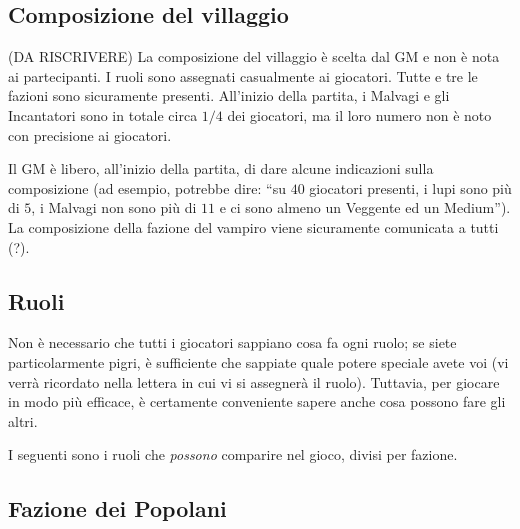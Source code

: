 \documentclass[a4paper,10pt]{article}
\begin{document}
\subsection{Composizione del villaggio}

(DA RISCRIVERE)
La composizione del villaggio è scelta dal GM e non è nota ai partecipanti. I ruoli sono assegnati casualmente ai giocatori.
Tutte e tre le fazioni sono sicuramente presenti. All'inizio della partita, i Malvagi e gli Incantatori sono in totale circa $1/4$ dei giocatori, ma il loro numero non è noto con precisione ai giocatori.

Il GM è libero, all'inizio della partita, di dare alcune indicazioni sulla composizione (ad esempio, potrebbe dire: ``su $40$ giocatori presenti, i lupi sono più di $5$, i Malvagi non sono più di $11$ e ci sono almeno un Veggente ed un Medium''). La composizione della fazione del vampiro viene sicuramente comunicata a tutti (?).


\subsection{Ruoli}

Non è necessario che tutti i giocatori sappiano cosa fa ogni ruolo; se siete particolarmente pigri, è sufficiente che sappiate quale potere speciale avete voi (vi verrà ricordato nella lettera in cui vi si assegnerà il ruolo). Tuttavia, per giocare in modo più efficace, è certamente conveniente sapere anche cosa possono fare gli altri.


I seguenti sono i ruoli che \emph{possono} comparire nel gioco, divisi per fazione.


\subsection*{Fazione dei Popolani}
\end{document}
